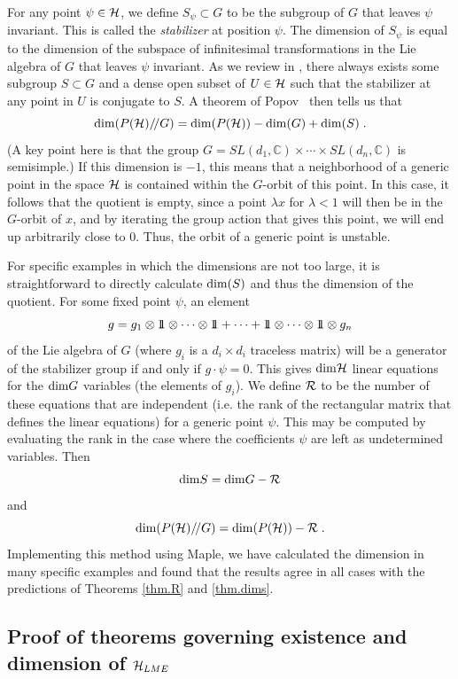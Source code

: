 \documentclass[12pt]{article}
\theoremstyle{definition}
\newcommand{\be}{\begin{equation}}
\newcommand{\ee}{\end{equation}}
\def\identity{{\rlap{1} \hskip 1.6pt \hbox{1}}}
\newcommand{\GITquot}{/\!/}
\begin{document}
For any point $\psi \in {\cal H}$, we define $S_\psi \subset G$ to be the subgroup of $G$ that leaves $\psi$ invariant. This is called the {\it stabilizer} at position $\psi$. The dimension of $S_\psi$ is equal to the dimension of the subspace of infinitesimal transformations in the Lie algebra of $G$ that leaves $\psi$ invariant. As we review in \cite{mathpaper}, there always exists some subgroup $S \subset G$ and a dense open subset of $U \in {\cal H}$ such that the stabilizer at any point in $U$ is conjugate to $S$. A theorem of Popov~\cite{vlpopov} then tells us that
\be
\label{realdim}
{\rm dim}(P({\cal H})\GITquot G) = {\rm dim}(P({\cal H})) - {\rm dim}(G) + {\rm dim}(S)    \; .
\ee
(A key point here is that the group $G = SL(d_1, \mathbb{C}) \times \cdots \times SL(d_n, \mathbb{C})$ is semisimple.)
If this dimension is $-1$, this means that a neighborhood of a generic point in the space ${\cal H}$ is contained within the $G$-orbit of this point. In this case, it follows that the quotient is empty, since a point $\lambda x$ for $\lambda < 1$ will then be in the $G$-orbit of $x$, and by iterating the group action that gives this point, we will end up arbitrarily close to 0. Thus, the orbit of a generic point is unstable.

For specific examples in which the dimensions are not too large, it is straightforward to directly calculate ${\rm dim}(S)$ and thus the dimension of the quotient.  For some fixed point $\psi$, an element
\be
g = g_1 \otimes \identity \otimes \cdots \otimes \identity + \dots + \identity \otimes \cdots \otimes \identity \otimes g_n
\ee 
of the Lie algebra of $G$ (where $g_i$ is a $d_i \times d_i$ traceless matrix) will be a generator of the stabilizer group if and only if $g \cdot \psi = 0$. This gives ${\rm dim}{\cal H}$ linear equations for the ${\rm dim}G$ variables (the elements of $g_i$). We define ${\cal R}$ to be the number of these equations that are independent (i.e. the rank of the rectangular matrix that defines the linear equations) for a generic point $\psi$. This may be computed by evaluating the rank in the case where the coefficients $\psi$ are left as undetermined variables. Then
\be
{\rm dim} S = {\rm dim}G - {\cal R}
\ee
and 
\be
{\rm dim}(P({\cal H})\GITquot G) = {\rm dim}(P({\cal H})) - {\cal R} \; .
\ee
Implementing this method using Maple, we have calculated the dimension in many specific examples and found that the results agree in all cases with the predictions of Theorems \ref{thm.R} and \ref{thm.dims}. 

\subsection{Proof of theorems governing existence and dimension of ${\cal H}_{LME}$}
\end{document}
